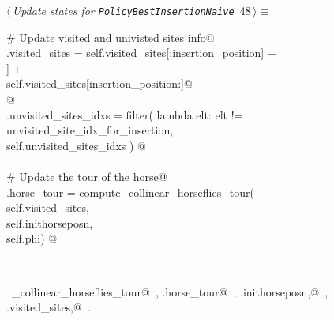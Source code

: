 \documentclass[11.5pt]{report}
\begin{document}
\vspace{-0.8cm}\newchunk 

\begin{flushleft} \small\label{scrap72}\raggedright\small
{} $\langle\,${\itshape Update states for \texttt{PolicyBestInsertionNaive}}\nobreak\ {\footnotesize {48}}$\,\rangle\equiv$
\vspace{-1ex}
\begin{list}{}{} \item
\mbox{}\verb@# Update visited and univisted sites info@\\
\mbox{}\verb@self.visited_sites = self.visited_sites[:insertion_position]      +\@\\
\mbox{}\verb@                     [self.sites[unvisited_site_idx_for_insertion]] +\@\\
\mbox{}\verb@                     self.visited_sites[insertion_position:]@\\
\mbox{}\verb@  @\\
\mbox{}\verb@self.unvisited_sites_idxs = filter( lambda elt: elt != unvisited_site_idx_for_insertion, \@\\
\mbox{}\verb@                                    self.unvisited_sites_idxs ) @\\
\mbox{}\verb@@\\
\mbox{}\verb@# Update the tour of the horse@\\
\mbox{}\verb@self.horse_tour = compute_collinear_horseflies_tour(\@\\
\mbox{}\verb@                           self.visited_sites,         \@\\
\mbox{}\verb@                           self.inithorseposn, \@\\
\mbox{}\verb@                           self.phi) @\\
\mbox{}\verb@@{\NWsep}
\end{list}
\vspace{-1.5ex}
\footnotesize
\begin{list}{}{\setlength{\itemsep}{-\parsep}\setlength{\itemindent}{-\leftmargin}}
\item \NWtxtMacroRefIn\ .
\item \NWtxtIdentsUsed\nobreak\  \verb@compute_collinear_horseflies_tour@\nobreak\ , \verb@self.horse_tour@\nobreak\ , \verb@self.inithorseposn,@\nobreak\ , \verb@self.visited_sites,@\nobreak\ .
\item{}
\end{list}
\vspace{4ex}
\end{flushleft}
\newpage
\end{document}
